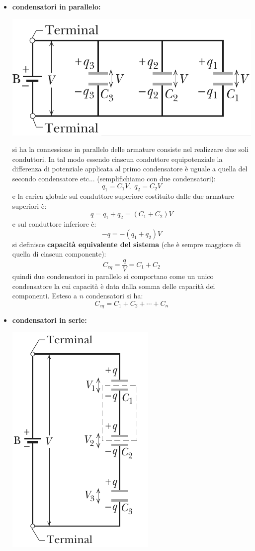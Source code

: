 \documentclass[a4paper,12pt, oneside]{book}
\begin{document}
\begin{itemize}
	\item \textbf{condensatori in parallelo:}
	      \begin{center}
		      \includegraphics[scale=0.5]{img/ele4.png}
	      \end{center}
	      si ha la connessione in parallelo delle armature consiste nel realizzare due soli conduttori. In tal modo essendo ciascun conduttore equipotenziale la differenza di potenziale applicata al  primo condensatore è uguale a quella del secondo condensatore etc... (semplifichiamo con due condensatori):
	      $$q_1=C_1V,\,\,q_2=C_2V$$
	      e la carica globale sul conduttore superiore costituito dalle due armature superiori è:
	      $$q=q_1+q_2=(C_1+C_2)V$$
	      e sul conduttore inferiore è:
	      $$-q=-(q_1+q_2)V$$
	      si definisce \textbf{capacità equivalente del sistema} (che è sempre maggiore di quella di ciascun componente):
	      $$C_{eq}=\frac{q}{V}=C_1+C_2$$
	      quindi due condensatori in parallelo si comportano come un unico condensatore la cui capacità è data dalla somma delle capacità dei componenti. Esteso a $n$ condensatori si ha:
	      $$C_{eq}=C_1+C_2+\cdots+C_n$$
	\item \textbf{condensatori in serie:}
	      \begin{center}
		      \includegraphics[scale=0.7]{img/ele5.png}

\end{center}
\end{itemize}
\end{document}
